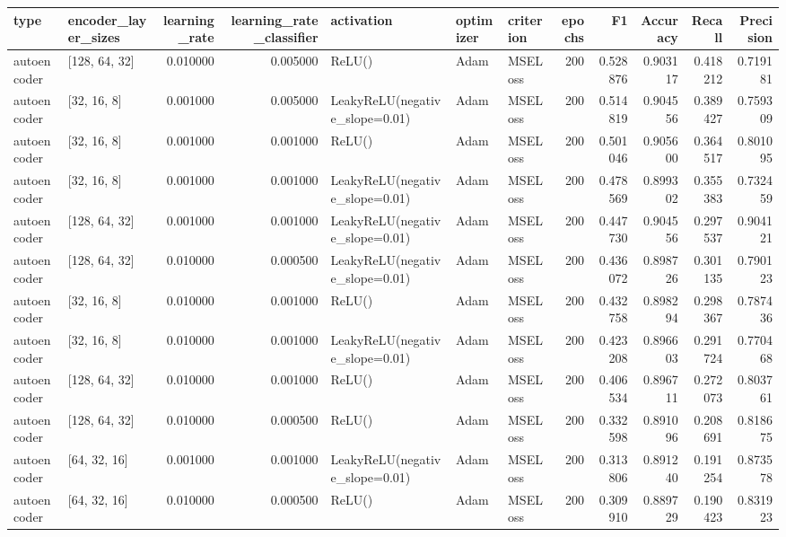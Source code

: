 \documentclass[10pt,twocolumn,letterpaper]{article}
\begin{document}
\begin{appendices}
{   \begin{center}
   \begin{tabular}{llrrlllrrrrr}
      \hline
      type & encoder\_layer\_sizes & learning\_rate & learning\_rate\_classifier & activation & optimizer & criterion & epochs & F1 & Accuracy & Recall & Precision \\
      \hline
      autoencoder & [128, 64, 32] & 0.010000 & 0.005000 & ReLU() & Adam & MSELoss & 200 & 0.528876 & 0.903117 & 0.418212 & 0.719181 \\
      autoencoder & [32, 16, 8] & 0.001000 & 0.005000 & LeakyReLU(negative\_slope=0.01) & Adam & MSELoss & 200 & 0.514819 & 0.904556 & 0.389427 & 0.759309 \\
      autoencoder & [32, 16, 8] & 0.001000 & 0.001000 & ReLU() & Adam & MSELoss & 200 & 0.501046 & 0.905600 & 0.364517 & 0.801095 \\
      autoencoder & [32, 16, 8] & 0.001000 & 0.001000 & LeakyReLU(negative\_slope=0.01) & Adam & MSELoss & 200 & 0.478569 & 0.899302 & 0.355383 & 0.732459 \\
      autoencoder & [128, 64, 32] & 0.001000 & 0.001000 & LeakyReLU(negative\_slope=0.01) & Adam & MSELoss & 200 & 0.447730 & 0.904556 & 0.297537 & 0.904121 \\
      autoencoder & [128, 64, 32] & 0.010000 & 0.000500 & LeakyReLU(negative\_slope=0.01) & Adam & MSELoss & 200 & 0.436072 & 0.898726 & 0.301135 & 0.790123 \\
      autoencoder & [32, 16, 8] & 0.010000 & 0.001000 & ReLU() & Adam & MSELoss & 200 & 0.432758 & 0.898294 & 0.298367 & 0.787436 \\
      autoencoder & [32, 16, 8] & 0.010000 & 0.001000 & LeakyReLU(negative\_slope=0.01) & Adam & MSELoss & 200 & 0.423208 & 0.896603 & 0.291724 & 0.770468 \\
      autoencoder & [128, 64, 32] & 0.010000 & 0.001000 & ReLU() & Adam & MSELoss & 200 & 0.406534 & 0.896711 & 0.272073 & 0.803761 \\
      autoencoder & [128, 64, 32] & 0.010000 & 0.000500 & ReLU() & Adam & MSELoss & 200 & 0.332598 & 0.891096 & 0.208691 & 0.818675 \\
      autoencoder & [64, 32, 16] & 0.001000 & 0.001000 & LeakyReLU(negative\_slope=0.01) & Adam & MSELoss & 200 & 0.313806 & 0.891240 & 0.191254 & 0.873578 \\
      autoencoder & [64, 32, 16] & 0.010000 & 0.000500 & ReLU() & Adam & MSELoss & 200 & 0.309910 & 0.889729 & 0.190423 & 0.831923 \\

\end{tabular}
\end{center}}
\end{appendices}
\end{document}
